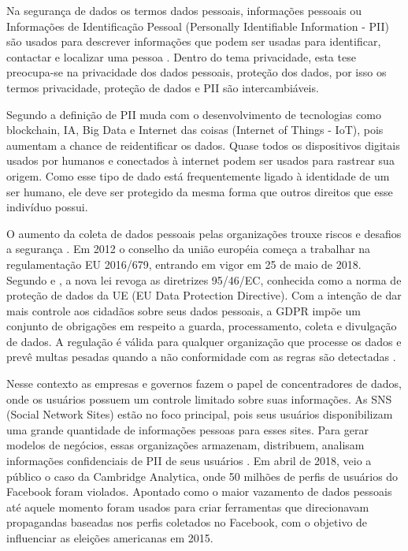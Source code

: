 Na segurança de dados os termos dados pessoais, informações pessoais ou Informações de Identificação Pessoal (Personally Identifiable Information - PII) são usados para descrever informações que podem ser usadas para identificar, contactar e localizar uma pessoa \cite{Personal37:online}. Dentro do tema privacidade, esta tese preocupa-se na privacidade dos dados pessoais, proteção dos dados, por isso os termos privacidade, proteção de dados e PII são intercambiáveis.


Segundo \citet{Schwerin2018} a definição de PII muda com o desenvolvimento de tecnologias como blockchain, IA, Big Data e Internet das coisas (Internet of Things - IoT), pois aumentam a chance de reidentificar os dados. %
Quase todos os dispositivos digitais usados por humanos e conectados à internet podem ser usados para rastrear sua origem. %
Como esse tipo de dado está frequentemente ligado à identidade de um ser humano, ele deve ser protegido da mesma forma que outros direitos que esse indivíduo possui.

O aumento da coleta de dados pessoais pelas organizações trouxe riscos e desafios a segurança \citep{Teixeira2019:article}. Em 2012 o conselho da união européia começa a trabalhar na regulamentação EU 2016/679, entrando em vigor em 25 de maio de 2018. Segundo \citet{gabriela_eu_2018:article} e \citet{Teixeira2019:article}, a nova lei revoga as diretrizes 95/46/EC, conhecida como a norma de proteção de dados da UE (EU Data Protection Directive). Com a intenção de dar mais controle aos cidadãos sobre seus dados pessoais, a GDPR impõe um conjunto de obrigações em respeito a guarda, processamento, coleta e divulgação de dados. A regulação é válida para qualquer organização que processe os dados e prevê multas pesadas quando a não conformidade com as regras são detectadas \citep{EuropeanCommission2016:misc}.

Nesse contexto as empresas e governos fazem o papel de concentradores de dados, onde os usuários possuem um controle limitado sobre suas informações. As SNS (Social Network Sites) estão no foco principal, pois seus usuários disponibilizam uma grande quantidade de informações pessoas para esses sites. Para gerar modelos de negócios, essas organizações armazenam, distribuem, analisam informações confidenciais de PII de seus usuários \cite{Al-ZabenNasr2018:article}. Em abril de 2018, veio a público o caso da Cambridge Analytica, onde 50 milhões de perfis de usuários do Facebook foram violados. Apontado como o maior vazamento de dados pessoais até aquele momento foram usados para criar ferramentas que direcionavam propagandas baseadas nos perfis coletados no Facebook, com o objetivo de influenciar as eleições americanas em 2015.

